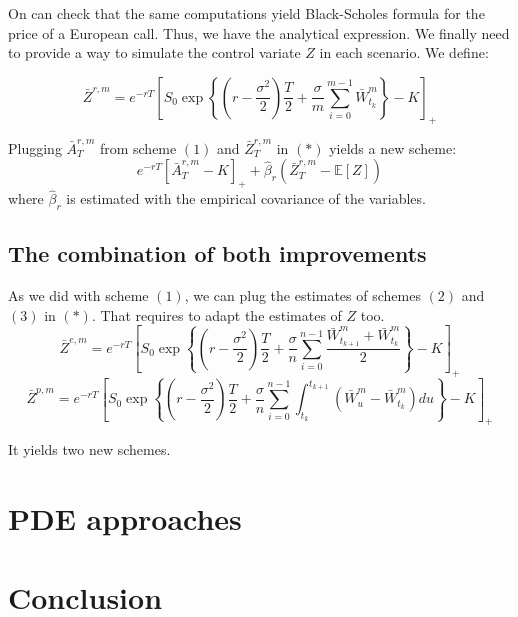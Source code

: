 \documentclass{article}
\begin{document}
On can check that the same computations yield Black-Scholes formula for the price of a European call.
Thus, we have the analytical expression. We finally need to provide a way to simulate the control variate $Z$
in each scenario. We define:

\begin{equation}
	\bar Z^{r, m} = e^{-rT} \left[ S_0 \exp \left\{ \left( r - \frac{\sigma^2}{2} \right) \frac{T}{2} +
		\frac{\sigma}{m} \sum_{i=0}^{m-1} \bar W_{t_k}^m \right\} - K \right]_+
	\tag{$i$}
\end{equation}

Plugging $\bar A_T^{r, m}$ from scheme $(1)$ and $\bar Z_T^{r, m}$ in $(\ast)$ yields a new scheme:
\begin{equation}
	e^{-rT} \left[ \bar A_T^{r, m} - K \right]_+ + \hat\beta_r \left( \bar Z_T^{r, m} - \mathbb E [Z] \right)
	\tag{4}
\end{equation}
where $\hat\beta_r$ is estimated with the empirical covariance of the variables.

\subsection{The combination of both improvements}

As we did with scheme $(1)$, we can plug the estimates of schemes $(2)$ and $(3)$ in $(\ast)$. That requires
to adapt the estimates of $Z$ too.
\begin{equation}
	\bar Z^{e, m} = e^{-rT} \left[ S_0 \exp \left\{ \left( r - \frac{\sigma^2}{2} \right) \frac{T}{2} +
		\frac{\sigma}{n} \sum_{i=0}^{n-1} \frac{\bar W_{t_{k+1}}^m + \bar W_{t_k}^m}{2} \right\} - K \right]_+
	\tag{$ii$}
\end{equation}
\begin{equation}
	\bar Z^{p, m} = e^{-rT} \left[ S_0 \exp \left\{ \left( r - \frac{\sigma^2}{2} \right) \frac{T}{2} +
		\frac{\sigma}{n} \sum_{i=0}^{n-1}
		\int_{t_k}^{t_{k+1}} \left( \bar W_u^m - \bar W_{t_k}^m \right) du
		\right\} - K \right]_+
	\tag{$iii$}
\end{equation}

It yields two new schemes.

\section{PDE approaches}

\section*{Conclusion}


{}

\end{document}

